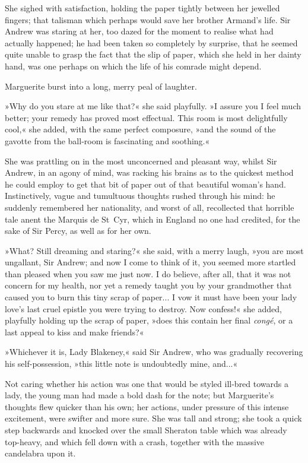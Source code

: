 She sighed with satisfaction, holding the paper tightly between her jewelled fingers; that talisman which perhaps would save her brother Armand's life. Sir Andrew was staring at her, too dazed for the moment to realise what had actually happened; he had been taken so completely by surprise, that he seemed quite unable to grasp the fact that the slip of paper, which she held in her dainty hand, was one perhaps on which the life of his comrade might depend.

Marguerite burst into a long, merry peal of laughter.

»Why do you stare at me like that?« she said playfully. »I assure you I feel much better; your remedy has proved most effectual. This room is most delightfully cool,« she added, with the same perfect composure, »and the sound of the gavotte from the ball-room is fascinating and soothing.«

She was prattling on in the most unconcerned and pleasant way, whilst Sir Andrew, in an agony of mind, was racking his brains as to the quickest method he could employ to get that bit of paper out of that beautiful woman's hand. Instinctively, vague and tumultuous thoughts  rushed through his mind: he suddenly remembered her nationality, and worst of all, recollected that horrible tale anent the Marquis de St~Cyr, which in England no one had credited, for the sake of Sir Percy, as well as for her own.

»What? Still dreaming and staring?« she said, with a merry laugh, »you are most ungallant, Sir Andrew; and now I come to think of it, you seemed more startled than pleased when you saw me just now. I do believe, after all, that it was not concern for my health, nor yet a remedy taught you by your grandmother that caused you to burn this tiny scrap of paper... I vow it must have been your lady love's last cruel epistle you were trying to destroy. Now confess!« she added, playfully holding up the scrap of paper, »does this contain her final \textit{congé}, or a last appeal to kiss and make friends?«

»Whichever it is, Lady Blakeney,« said Sir Andrew, who was gradually recovering his self-possession, »this little note is undoubtedly mine, and...«

Not caring whether his action was one that would be styled ill-bred towards a lady, the young man had made a bold dash for the note; but Marguerite's thoughts flew quicker than his own; her actions, under pressure of this intense excitement, were swifter and more sure. She was tall and strong; she took a quick step backwards and knocked over the small Sheraton table which was already top-heavy, and which fell down with a crash, together with the massive candelabra upon it.

